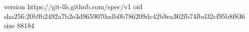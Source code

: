 version https://git-lfs.github.com/spec/v1
oid sha256:20b9b2492a7b2e3d9659070adb0b786209dc42b9ea362fb74fbd32cf95b8f836
size 88184
